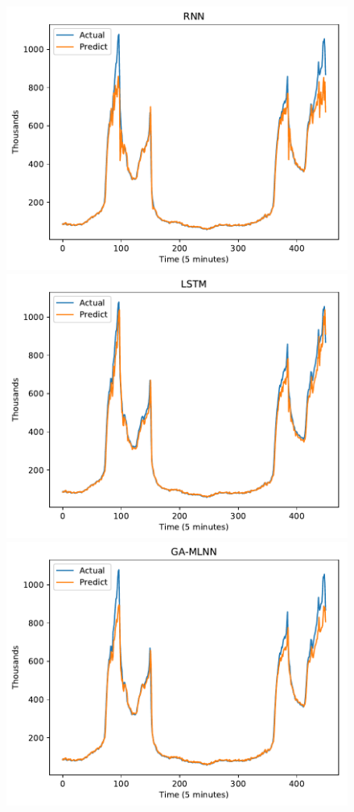 \documentclass[11pt,twoside]{article}
\begin{document}
\begin{multicols}{2}
\begin{figure}[!ht] 
  \begin{minipage}[b]{0.33\linewidth}
    \centering
    \includegraphics[width=0.9\linewidth]{predict/k5/wc_k5_rnn.pdf} 
  \end{minipage}
  \begin{minipage}[b]{0.33\linewidth}
    \centering
    \includegraphics[width=0.9\linewidth]{predict/k5/wc_k5_lstm.pdf} 
  \end{minipage} 
  \begin{minipage}[b]{0.33\linewidth}
    \centering
    \includegraphics[width=0.9\linewidth]{predict/k5/wc_k5_ga_mlnn.pdf} 

\end{minipage}
\end{figure}
\end{multicols}
\end{document}

